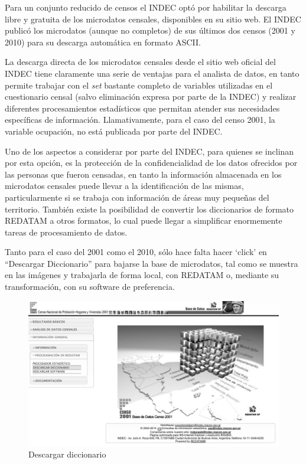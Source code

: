 \documentclass[
]{article}
\begin{document}
Para un conjunto reducido de censos el INDEC optó por habilitar la descarga libre y gratuita de los microdatos censales, disponibles en su sitio web. El INDEC publicó los microdatos (aunque no completos) de sus últimos dos censos (2001 y 2010) para su descarga automática en formato ASCII.

La descarga directa de los microdatos censales desde el sitio web oficial del INDEC tiene claramente una serie de ventajas para el analista de datos, en tanto permite trabajar con el \emph{set} bastante completo de variables utilizadas en el cuestionario censal (salvo eliminación expresa por parte de la INDEC) y realizar diferentes procesamientos estadísticos que permitan atender sus necesidades específicas de información. Llamativamente, para el caso del censo 2001, la variable ocupación, no está publicada por parte del INDEC.

Uno de los aspectos a considerar por parte del INDEC, para quienes se inclinan por esta opción, es la protección de la confidencialidad de los datos ofrecidos por las personas que fueron censadas, en tanto la información almacenada en los microdatos censales puede llevar a la identificación de las mismas, particularmente si se trabaja con información de áreas muy pequeñas del territorio. También existe la posibilidad de convertir los diccionarios de formato REDATAM a otros formatos, lo cual puede llegar a simplificar enormemente tareas de procesamiento de datos.

Tanto para el caso del 2001 como el 2010, sólo hace falta hacer `click' en ``Descargar Diccionario'' para bajarse la base de microdatos, tal como se muestra en las imágenes y trabajarla de forma local, con REDATAM o, mediante su transformación, con su software de preferencia.

\begin{figure}

{\centering \includegraphics[width=0.8\linewidth]{imagenes_byn/dic2001} 

}

\caption{Descargar diccionario}\label{fig:unnamed-chunk-35}
\end{figure}
\end{document}
